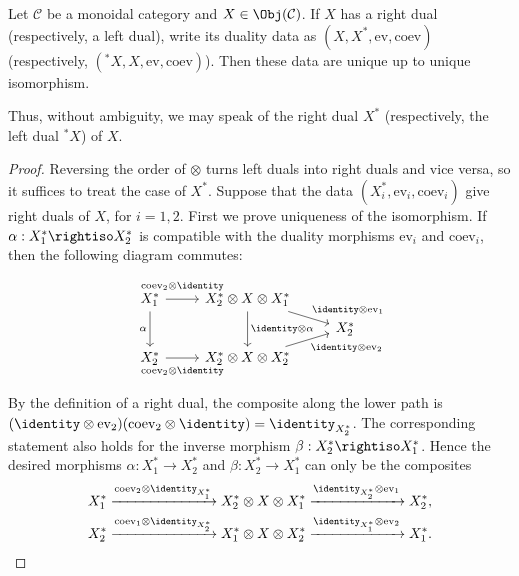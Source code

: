 \begin{definition-proposition}\label{def:dual-uniqueness}
	Let $\mathcal{C}$ be a monoidal category and
	$X\in\Obj(\mathcal{C})$. If $X$ has a right dual (respectively, a left
	dual), write its duality data as
	$(X,X^*,\mathrm{ev},\mathrm{coev})$ (respectively,
	$({}^*X,X,\mathrm{ev},\mathrm{coev})$). Then these data are unique up to
	unique isomorphism.

	Thus, without ambiguity, we may speak of the right dual $X^*$
	(respectively, the left dual ${}^*X$) of $X$.
\end{definition-proposition}
\begin{proof}
	Reversing the order of $\otimes$ turns left duals into right duals and
	vice versa, so it suffices to treat the case of $X^*$. Suppose that the
	data $(X_i^*,\mathrm{ev}_i,\mathrm{coev}_i)$ give right duals of $X$, for
	$i=1,2$. First we prove uniqueness of the isomorphism. If
	$\alpha:X_1^*\rightiso X_2^*$ is compatible with the duality morphisms
	$\mathrm{ev}_i$ and $\mathrm{coev}_i$, then the following diagram
	commutes:
	\[\begin{tikzcd}[row sep=tiny]
		X_1^* \arrow[dd, "\alpha"'] \arrow[r, "{\mathrm{coev}_2 \otimes \identity}" inner sep=0.6em] & X_2^* \otimes X \otimes X_1^* \arrow[dd, "{\identity \otimes \alpha}"] \arrow[rd, "{\identity \otimes \mathrm{ev}_1}"] & \\
		& & X_2^* \\
		X_2^* \arrow[r, "{\mathrm{coev}_2 \otimes \identity}"' inner sep=0.6em] & X_2^* \otimes X \otimes X_2^* \arrow[ru, "{\identity \otimes \mathrm{ev}_2}"'] &
	\end{tikzcd}\]
	By the definition of a right dual, the composite along the lower path is
	$(\identity\otimes\mathrm{ev}_2)(\mathrm{coev}_2\otimes\identity)
	=\identity_{X_2^*}$. The corresponding statement also holds for the
	inverse morphism $\beta:X_2^*\rightiso X_1^*$. Hence the desired
	morphisms $\alpha:X_1^*\to X_2^*$ and $\beta:X_2^*\to X_1^*$ can only be
	the composites
	\begin{gather*}
		X_1^* \xrightarrow{\mathrm{coev}_2 \otimes \identity_{X_1^*}} X_2^* \otimes X \otimes X_1^* \xrightarrow{\identity_{X_2^*} \otimes \mathrm{ev}_1} X_2^* , \\
		X_2^* \xrightarrow{\mathrm{coev}_1 \otimes \identity_{X_2^*}} X_1^* \otimes X \otimes X_2^* \xrightarrow{\identity_{X_1^*} \otimes \mathrm{ev}_2} X_1^* .
	\end{gather*}


\end{proof}
